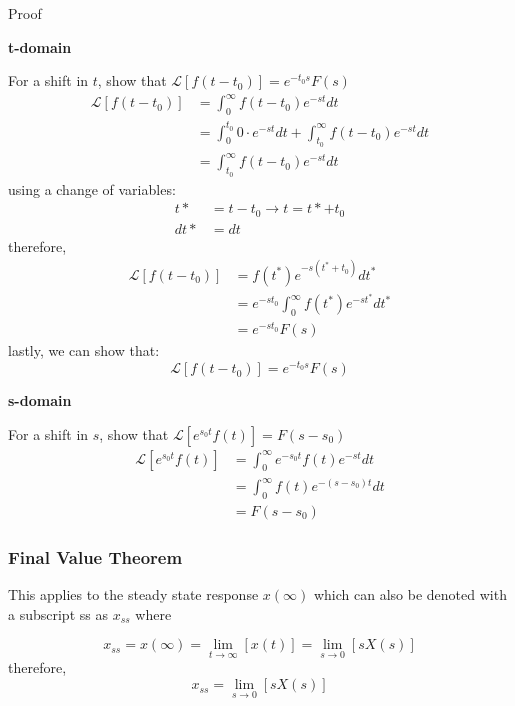 \documentclass[12pt,letter]{article}
\numberwithin{ex}{section} %
\numberwithin{re}{section} %
\newcommand{\gr}[1]{\textcolor[rgb]{0.00,0.50,0.00}{#1}}
\newcommand{\Laplace}[1]{\ensuremath{\mathcal{L}{\left[#1\right]}}}
\numberwithin{equation}{section}	%
\begin{document}
\begin{mdframed}[middlelinewidth=0.5mm]
\begin{center}
\gr{Proof}
\end{center}
\noindent \textbf{t-domain}

For a shift in $t$, show that $\Laplace{f(t-t_0)} = e^{-t_0s}F(s)$
\begin{align}
\Laplace{f(t-t_0)} &= \int_0^\infty f(t-t_0) e^{-st}dt  \\
&= \int_0^{t_0} 0 \cdot e^{-st}dt + \int_{t_0}^\infty f(t-t_0) e^{-st}dt  \nonumber \\
&= \int_{t_0}^\infty f(t-t_0) e^{-st}dt  \nonumber
\end{align}
using a change of variables:
\begin{align}
t* &= t-t_0 \rightarrow t = t*+t_0\\
dt* &= dt  \nonumber
\end{align}
therefore, 
\begin{align}
\Laplace{f(t-t_0)} &= f(t^*)e^{-s(t^*+t_0)}dt^*     \\
&= e^{-s t_0} \int_0^{\infty} f(t^*)e^{-s t^*}dt^*  \nonumber \\
&= e^{-s t_0} F(s)  \nonumber
\end{align}
lastly, we can show that:
\begin{equation}
\Laplace{f(t-t_0)} = e^{-t_0s}F(s)
\end{equation}

\noindent \textbf{s-domain}

For a shift in $s$, show that $\Laplace{e^{s_0t}f(t)} = F(s-s_0)$
\begin{align}
\Laplace{e^{s_0t}f(t)} &= \int_0^{\infty} e^{-s_0 t}  f(t)e^{-s t}dt  \nonumber \\
&=\int_0^{\infty} f(t)e^{-(s-s_0) t}dt  \nonumber \\
&= F(s-s_0)
\end{align}

\end{mdframed}

 


\subsubsection{Final Value Theorem}
This applies to the steady state response $x(\infty)$ which can also be denoted with a subscript ss as $x_{ss}$ where

\begin{equation}
x_{ss} = x(\infty)  = \lim\limits_{t\rightarrow \infty} [x(t)]  =  \lim\limits_{s\rightarrow 0} [s X(s)]
\end{equation}
therefore, 
\begin{equation}
x_{ss} =  \lim\limits_{s\rightarrow 0} [s X(s)]
\end{equation}
\end{document}

